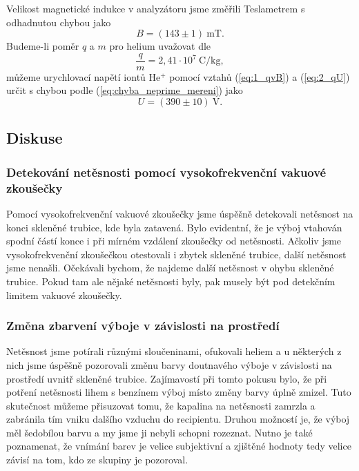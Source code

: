 \documentclass[english]{article}
\newcommand{\unit}[1]{~\mathrm{#1}}
\begin{document}
			Velikost magnetické indukce v analyzátoru jsme změřili Teslametrem s odhadnutou chybou jako 
			\begin{equation}
				B = (143\pm1)\unit{mT}.
			\end{equation}
			Budeme-li poměr $q$ a $m$ pro helium uvažovat dle \cite{bib:constants}
			\begin{equation}
				\frac{q}{m}=2,41\cdot 10^7\unit{C/kg},
			\end{equation}
			můžeme urychlovací napětí iontů $\mathrm{He^{+}}$ pomocí vztahů (\ref{eq:1_qvB}) a (\ref{eq:2_qU}) určit s chybou podle (\ref{eq:chyba_neprime_mereni}) jako
			\begin{equation}
				U = (390\pm10)\unit{V}.
			\end{equation}
			
	\subsection{Diskuse}
    	
		\subsubsection{Detekování netěsnosti pomocí vysokofrekvenční vakuové zkoušečky}
			Pomocí vysokofrekvenční vakuové zkoušečky jsme úspěšně detekovali netěsnost na konci skleněné trubice, kde byla zatavená. Bylo evidentní, že je výboj vtahován spodní částí konce i při mírném vzdálení zkoušečky od netěsnosti. Ačkoliv jsme vysokofrekvenční zkoušečkou otestovali i zbytek skleněné trubice, další netěsnost jsme nenašli. Očekávali bychom, že najdeme další netěsnost v ohybu skleněné trubice. Pokud tam ale nějaké netěsnosti byly, pak musely být pod detekčním limitem vakuové zkoušečky.
			
		\subsubsection{Změna zbarvení výboje v závislosti na prostředí}
			Netěsnost jsme potírali různými sloučeninami, ofukovali heliem a u některých z nich jsme úspěšně pozorovali změnu barvy doutnavého výboje v závislosti na prostředí uvnitř skleněné trubice. Zajímavostí při tomto pokusu bylo, že při potření netěsnosti lihem s benzínem výboj místo změny barvy úplně zmizel. Tuto skutečnost můžeme přisuzovat tomu, že kapalina na netěsnosti zamrzla a zabránila tím vniku dalšího vzduchu do recipientu. Druhou možností je, že výboj měl šedobílou barvu a my jsme ji nebyli schopni rozeznat. Nutno je také poznamenat, že vnímání barev je velice subjektivní a zjištěné hodnoty tedy velice závisí na tom, kdo ze skupiny je pozoroval.
		
\end{document}
